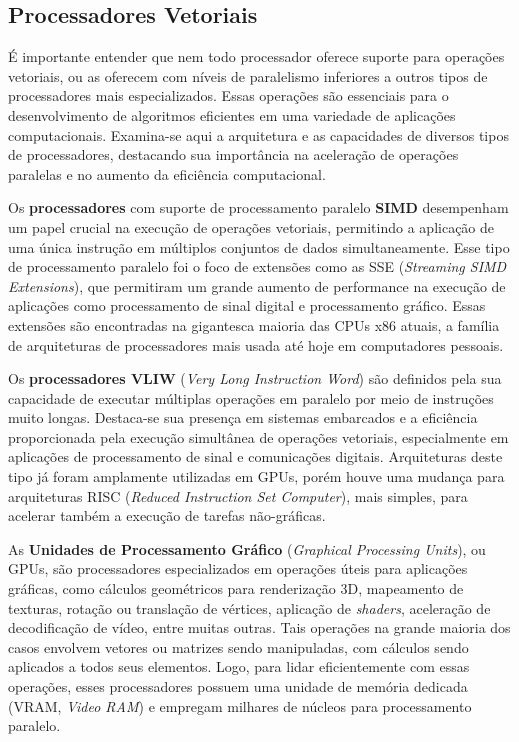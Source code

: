\documentclass[12pt,
openright, 
oneside, %
a4paper,    %
brazil]{facom-ufu-abntex2}
\begin{document}




\subsection{Processadores Vetoriais}
\label{ssc:vetorial}

É importante entender que nem todo processador oferece suporte para operações vetoriais, ou as oferecem com níveis de paralelismo inferiores a outros tipos de processadores mais especializados. Essas operações são essenciais para o desenvolvimento de algoritmos eficientes em uma variedade de aplicações computacionais. Examina-se aqui a arquitetura e as capacidades de diversos tipos de processadores, destacando sua importância na aceleração de operações paralelas e no aumento da eficiência computacional.

Os \textbf{processadores} com suporte de processamento paralelo \textbf{SIMD} desempenham um papel crucial na execução de operações vetoriais, permitindo a aplicação de uma única instrução em múltiplos conjuntos de dados simultaneamente. Esse tipo de processamento paralelo foi o foco de extensões como as SSE (\textit{Streaming SIMD Extensions}), que permitiram um grande aumento de performance na execução de aplicações como processamento de sinal digital e processamento gráfico. Essas extensões são encontradas na gigantesca maioria das CPUs x86 atuais, a família de arquiteturas de processadores mais usada até hoje em computadores pessoais.

Os \textbf{processadores VLIW} (\textit{Very Long Instruction Word}) são definidos pela sua capacidade de executar múltiplas operações em paralelo por meio de instruções muito longas. Destaca-se sua presença em sistemas embarcados e a eficiência proporcionada pela execução simultânea de operações vetoriais, especialmente em aplicações de processamento de sinal e comunicações digitais. Arquiteturas deste tipo já foram amplamente utilizadas em GPUs, porém houve uma mudança para arquiteturas RISC (\textit{Reduced Instruction Set Computer}), mais simples, para acelerar também a execução de tarefas não-gráficas.

As \textbf{Unidades de Processamento Gráfico} (\textit{Graphical Processing Units}), ou GPUs, são processadores especializados em operações úteis para aplicações gráficas, como cálculos geométricos para renderização 3D, mapeamento de texturas, rotação ou translação de vértices, aplicação de \textit{shaders}, aceleração de decodificação de vídeo, entre muitas outras. Tais operações na grande maioria dos casos envolvem vetores ou matrizes sendo manipuladas, com cálculos sendo aplicados a todos seus elementos. Logo, para lidar eficientemente com essas operações, esses processadores possuem uma unidade de memória dedicada (VRAM, \textit{Video RAM}) e empregam milhares de núcleos para processamento paralelo.
\end{document}

